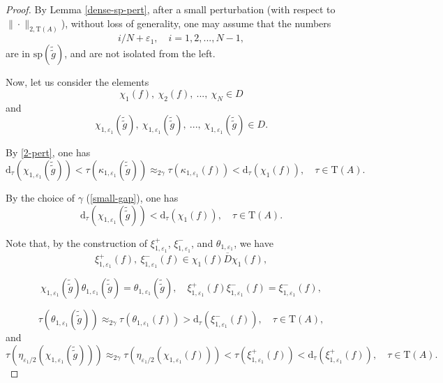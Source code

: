 \documentclass[12pt, oneside, psamsfonts]{amsart}
\theoremstyle{definition}
\theoremstyle{remark}
\numberwithin{equation}{section}
\newcommand{\norm}[1]{\| #1\|}
\newcommand{\eps}{\varepsilon}
\newcommand{\tr}{\mathrm{T}}
\begin{document}
\begin{proof}
By Lemma \ref{dense-sp-pert}, after a small perturbation (with respect to $\norm{\cdot}_{2, \tr(A)}$), without loss of generality, one may assume that the numbers 
$$i/N + \eps_1,\quad i=1, 2, ..., N-1,$$
are in $\mathrm{sp}(\tilde{\tilde{g}})$, and are  not isolated from the left.



Now, let us consider the elements
$$\chi_1(f),\ \chi_2(f),\ ...,\ \chi_N \in D$$
and
$$\chi_{1, \eps_1}(\tilde{\tilde{g}}),\ \chi_{1, \eps_1}(\tilde{\tilde{g}}),\ ...,\ \chi_{1, \eps_1}(\tilde{\tilde{g}}) \in D.$$



By \eqref{2-pert}, one has
\begin{equation}
\mathrm{d}_\tau(\chi_{1, \eps_1}(\tilde{\tilde{g}})) < \tau(\kappa_{1, \eps_1}(\tilde{\tilde{g}})) \approx_{2 \gamma} \tau(\kappa_{1, \eps_1}(f)) < \mathrm{d}_\tau(\chi_1(f)),\quad \tau\in \tr(A).
\end{equation}

By the choice of $\gamma$ (\eqref{small-gap}), one has
\begin{equation}
\mathrm{d}_\tau(\chi_{1, \eps_1}(\tilde{\tilde{g}})) < \mathrm{d}_\tau(\chi_1(f)),\quad \tau\in\tr(A).
\end{equation}

Note that, by the construction of $\xi_{1, \eps_1}^+$, $\xi_{1, \eps_1}^-$, and $\theta_{1, \eps_1}$, we have 
$$   \xi_{1, \eps_1}^+(f),\ \xi_{1, \eps_1}^-(f) \in \overline{\chi_1(f) D \chi_1(f) },  $$

$$ \chi_{1, \eps_1}(\tilde{\tilde{g}}) \theta_{1, \eps_1}(\tilde{\tilde{g}}) = \theta_{1, \eps_1}(\tilde{\tilde{g}}),\quad \xi_{1, \eps_1}^+(f) \xi_{1, \eps_1}^-(f) = \xi_{1, \eps_1}^-(f),  $$

$$ \tau(\theta_{1, \eps_1}(\tilde{\tilde{g}})) \approx_{2\gamma} \tau(\theta_{1, \eps_1}(f))  >   \mathrm{d}_\tau(\xi_{1, \eps_1}^-( f )),\quad \tau \in \tr(A), $$
and
$$ \tau(\eta_{\eps_1/2}(\chi_{1, \eps_1}(\tilde{\tilde{g}}))) \approx_{2 \gamma} \tau(\eta_{\eps_1/2}(\chi_{1, \eps_1}(f))) < \tau( \xi_{1, \eps_1}^+(f)) < \mathrm{d}_\tau( \xi_{1, \eps_1}^+(f)),\quad \tau\in \tr(A). $$


\end{proof}
\end{document}
